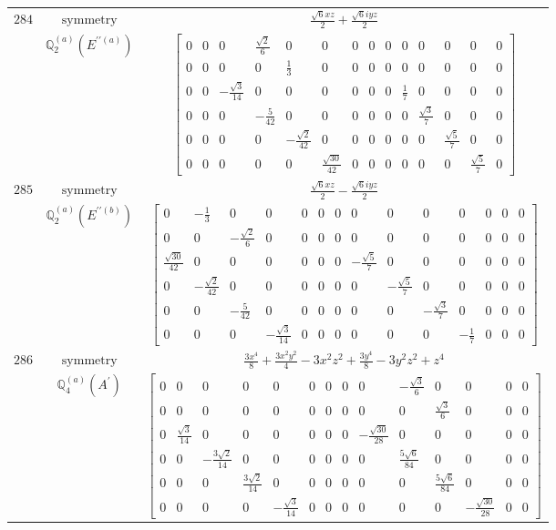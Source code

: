 \documentclass[fleqn,8pt,landscape]{jsarticle}
\begin{document}
\begin{longtable}{ccc}
$ 284 $ & $ \text{symmetry} $ & $ \frac{\sqrt{6} x z}{2} + \frac{\sqrt{6} i y z}{2} $ \\
$  $ & $ \mathbb{Q}_{2}^{(a)}(E^{\prime\prime(a)}) $ & $ \begin{bmatrix} 0 & 0 & 0 & \frac{\sqrt{2}}{6} & 0 & 0 & 0 & 0 & 0 & 0 & 0 & 0 & 0 & 0 \\ 0 & 0 & 0 & 0 & \frac{1}{3} & 0 & 0 & 0 & 0 & 0 & 0 & 0 & 0 & 0 \\ 0 & 0 & - \frac{\sqrt{3}}{14} & 0 & 0 & 0 & 0 & 0 & 0 & \frac{1}{7} & 0 & 0 & 0 & 0 \\ 0 & 0 & 0 & - \frac{5}{42} & 0 & 0 & 0 & 0 & 0 & 0 & \frac{\sqrt{3}}{7} & 0 & 0 & 0 \\ 0 & 0 & 0 & 0 & - \frac{\sqrt{2}}{42} & 0 & 0 & 0 & 0 & 0 & 0 & \frac{\sqrt{5}}{7} & 0 & 0 \\ 0 & 0 & 0 & 0 & 0 & \frac{\sqrt{30}}{42} & 0 & 0 & 0 & 0 & 0 & 0 & \frac{\sqrt{5}}{7} & 0 \end{bmatrix} $ \\ \hline
$ 285 $ & $ \text{symmetry} $ & $ \frac{\sqrt{6} x z}{2} - \frac{\sqrt{6} i y z}{2} $ \\
$  $ & $ \mathbb{Q}_{2}^{(a)}(E^{\prime\prime(b)}) $ & $ \begin{bmatrix} 0 & - \frac{1}{3} & 0 & 0 & 0 & 0 & 0 & 0 & 0 & 0 & 0 & 0 & 0 & 0 \\ 0 & 0 & - \frac{\sqrt{2}}{6} & 0 & 0 & 0 & 0 & 0 & 0 & 0 & 0 & 0 & 0 & 0 \\ \frac{\sqrt{30}}{42} & 0 & 0 & 0 & 0 & 0 & 0 & - \frac{\sqrt{5}}{7} & 0 & 0 & 0 & 0 & 0 & 0 \\ 0 & - \frac{\sqrt{2}}{42} & 0 & 0 & 0 & 0 & 0 & 0 & - \frac{\sqrt{5}}{7} & 0 & 0 & 0 & 0 & 0 \\ 0 & 0 & - \frac{5}{42} & 0 & 0 & 0 & 0 & 0 & 0 & - \frac{\sqrt{3}}{7} & 0 & 0 & 0 & 0 \\ 0 & 0 & 0 & - \frac{\sqrt{3}}{14} & 0 & 0 & 0 & 0 & 0 & 0 & - \frac{1}{7} & 0 & 0 & 0 \end{bmatrix} $ \\ \hline
$ 286 $ & $ \text{symmetry} $ & $ \frac{3 x^{4}}{8} + \frac{3 x^{2} y^{2}}{4} - 3 x^{2} z^{2} + \frac{3 y^{4}}{8} - 3 y^{2} z^{2} + z^{4} $ \\
$  $ & $ \mathbb{Q}_{4}^{(a)}(A^{\prime}) $ & $ \begin{bmatrix} 0 & 0 & 0 & 0 & 0 & 0 & 0 & 0 & 0 & - \frac{\sqrt{3}}{6} & 0 & 0 & 0 & 0 \\ 0 & 0 & 0 & 0 & 0 & 0 & 0 & 0 & 0 & 0 & \frac{\sqrt{3}}{6} & 0 & 0 & 0 \\ 0 & \frac{\sqrt{3}}{14} & 0 & 0 & 0 & 0 & 0 & 0 & - \frac{\sqrt{30}}{28} & 0 & 0 & 0 & 0 & 0 \\ 0 & 0 & - \frac{3 \sqrt{2}}{14} & 0 & 0 & 0 & 0 & 0 & 0 & \frac{5 \sqrt{6}}{84} & 0 & 0 & 0 & 0 \\ 0 & 0 & 0 & \frac{3 \sqrt{2}}{14} & 0 & 0 & 0 & 0 & 0 & 0 & \frac{5 \sqrt{6}}{84} & 0 & 0 & 0 \\ 0 & 0 & 0 & 0 & - \frac{\sqrt{3}}{14} & 0 & 0 & 0 & 0 & 0 & 0 & - \frac{\sqrt{30}}{28} & 0 & 0 \end{bmatrix} $ \\ \hline

\end{longtable}
\end{document}
